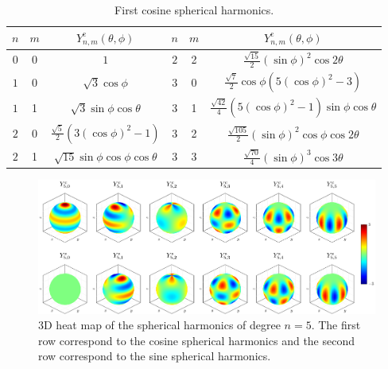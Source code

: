 \documentclass[../main.tex]{subfiles}
\begin{document}
\begin{table}[ht]
  \centering
  \captionsetup{type=table} %
  \begin{tabular}{c|c|c||c|c|c}
    $n$ & $m$ & $Y_{n,m}^{\mathrm{c}}(\theta,\phi)$     & $n$ & $m$ & $Y_{n,m}^{\mathrm{c}}(\theta,\phi)$                        \\
    \hline
    $0$ & 0   & $1$                                     & $2$ & 2   & $\frac{\sqrt{15}}{2}{(\sin\phi)}^2\cos 2\theta$            \\
    $1$ & 0   & $\sqrt{3}\cos\phi$                      & $3$ & 0   & $\frac{\sqrt{7}}{2}\cos\phi(5{(\cos\phi)}^2-3)$            \\
    $1$ & 1   & $\sqrt{3}\sin\phi\cos\theta$            & $3$ & 1   & $\frac{\sqrt{42}}{4}(5{(\cos\phi)}^2-1)\sin\phi\cos\theta$ \\
    $2$ & 0   & $\frac{\sqrt{5}}{2}(3{(\cos\phi)}^2-1)$ & $3$ & 2   & $\frac{\sqrt{105}}{2}{(\sin\phi)}^2\cos\phi\cos 2\theta$   \\
    $2$ & 1   & $\sqrt{15}\sin\phi\cos\phi\cos\theta$   & $3$ & 3   & $\frac{\sqrt{70}}{4}{(\sin\phi)}^3\cos 3\theta$            \\
  \end{tabular}
  \caption{First cosine spherical harmonics.}
\end{table}
\begin{figure}[ht]
  \centering
  \includegraphics[width=\textwidth]{Images/sphericalHarmonics.pdf}
  \caption{3D heat map of the spherical harmonics of degree $n=5$. The first row correspond to the cosine spherical harmonics and the second row correspond to the sine spherical harmonics.}
\end{figure}
\end{document}
